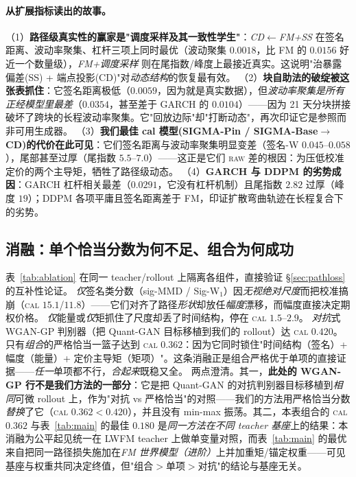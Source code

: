 \documentclass[11pt]{ctexart}
\newcommand{\raw}{\textsc{raw}}
\renewcommand{\cal}{\textsc{cal}}
\begin{document}
\paragraph{从扩展指标读出的故事。}
（1）\textbf{路径级真实性的赢家是"调度采样及其一致性学生"}：\emph{CD$\leftarrow$FM+SS} 在签名距离、波动率聚集、杠杆三项上同时最优（波动聚集 $0.0018$，比 FM 的 $0.0156$ 好近一个数量级），\emph{FM+调度采样} 则在尾指数/峰度上最接近真实。这说明"治暴露偏差(SS) + 端点投影(CD)"对\emph{动态结构}的恢复最有效。
（2）\textbf{块自助法的破绽被这张表抓住}：它签名距离极低（$0.0059$，因为就是真实数据），但\emph{波动率聚集是所有正经模型里最差}（$0.0354$，甚至差于 GARCH 的 $0.0104$）——因为 21 天分块拼接破坏了跨块的长程波动率聚集。它"回放边际"却"打断动态"，再次印证它是参照而非可用生成器。
（3）\textbf{我们最佳 cal 模型(SIGMA-Pin / SIGMA-Base$\to$CD)的代价在此可见}：它们签名距离与波动率聚集明显变差（签名-W $0.045$–$0.058$），尾部甚至过厚（尾指数 $5.5$–$7.0$）——这正是它们 \raw{} 差的根因：为压低校准定价的两个主导矩，牺牲了路径级动态。
（4）\textbf{GARCH 与 DDPM 的劣势成因}：GARCH 杠杆相关最差（$0.0291$，它没有杠杆机制）且尾指数 $2.82$ 过厚（峰度 $19$）；DDPM 各项平庸且签名距离差于 FM，印证扩散弯曲轨迹在长程复合下的劣势。

\subsection{消融：单个恰当分数为何不足、组合为何成功}
\label{sec:ablation-path}
表~\ref{tab:ablation} 在同一 teacher/rollout 上隔离各组件，直接验证 \S\ref{sec:pathloss} 的互补性论证。
\emph{仅}签名类分数（sig-MMD / Sig-W$_1$）因\emph{无视绝对尺度}而把校准搞崩（\cal{} $15.1$/$11.8$）——它们对齐了路径\emph{形状}却放任\emph{幅度}漂移，而幅度直接决定期权价格。
\emph{仅}能量或\emph{仅}矩抓住了尺度却丢了时间结构，停在 \cal{} $1.5$–$2.9$。
\emph{对抗}式 WGAN-GP 判别器（把 Quant-GAN 目标移植到我们的 rollout）达 \cal{} $0.420$。
只有\emph{组合}的严格恰当一篮子达到 \cal{} $0.362$：因为它同时锁住"时间结构（签名）+ 幅度（能量）+ 定价主导矩（矩项）"。这条消融正是组合严格优于单项的直接证据——\emph{任一}单项都不行，\emph{合起来}既稳又全。
两点澄清。其一，\textbf{此处的 WGAN-GP 行不是我们方法的一部分}：它是把 Quant-GAN 的对抗判别器目标移植到\emph{相同}可微 rollout 上，作为"对抗 vs 严格恰当"的对照——我们的方法用严格恰当分数\emph{替换}了它（\cal{} $0.362<0.420$），并且没有 min-max 振荡。其二，本表组合的 \cal{} $0.362$ 与表~\ref{tab:main} 的最佳 $0.180$ 是\emph{同一方法在不同 teacher 基座}上的结果：本消融为公平起见统一在 LWFM teacher 上做单变量对照，而表~\ref{tab:main} 的最优来自把同一路径损失施加在\emph{FM 世界模型（进阶）}上并加重矩/锚定权重——可见基座与权重共同决定终值，但"组合$>$单项$>$对抗"的结论与基座无关。
\end{document}
